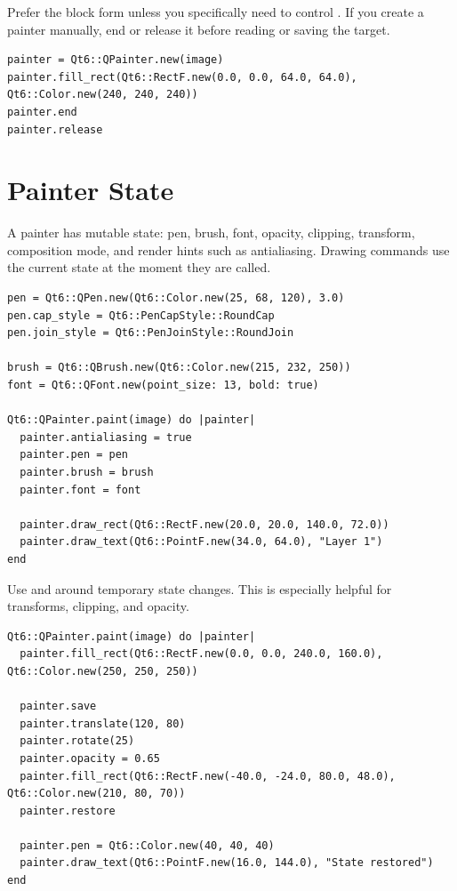Prefer the block form unless you specifically need to control . If you create a painter manually, end or release it before reading or saving the target.

\begin{lstlisting}[style=crystal]
painter = Qt6::QPainter.new(image)
painter.fill_rect(Qt6::RectF.new(0.0, 0.0, 64.0, 64.0), Qt6::Color.new(240, 240, 240))
painter.end
painter.release
\end{lstlisting}

\section{Painter State}

A painter has mutable state: pen, brush, font, opacity, clipping, transform, composition mode, and render hints such as antialiasing. Drawing commands use the current state at the moment they are called.

\begin{lstlisting}[style=crystal]
pen = Qt6::QPen.new(Qt6::Color.new(25, 68, 120), 3.0)
pen.cap_style = Qt6::PenCapStyle::RoundCap
pen.join_style = Qt6::PenJoinStyle::RoundJoin

brush = Qt6::QBrush.new(Qt6::Color.new(215, 232, 250))
font = Qt6::QFont.new(point_size: 13, bold: true)

Qt6::QPainter.paint(image) do |painter|
  painter.antialiasing = true
  painter.pen = pen
  painter.brush = brush
  painter.font = font

  painter.draw_rect(Qt6::RectF.new(20.0, 20.0, 140.0, 72.0))
  painter.draw_text(Qt6::PointF.new(34.0, 64.0), "Layer 1")
end
\end{lstlisting}

Use  and  around temporary state changes. This is especially helpful for transforms, clipping, and opacity.

\begin{lstlisting}[style=crystal]
Qt6::QPainter.paint(image) do |painter|
  painter.fill_rect(Qt6::RectF.new(0.0, 0.0, 240.0, 160.0), Qt6::Color.new(250, 250, 250))

  painter.save
  painter.translate(120, 80)
  painter.rotate(25)
  painter.opacity = 0.65
  painter.fill_rect(Qt6::RectF.new(-40.0, -24.0, 80.0, 48.0), Qt6::Color.new(210, 80, 70))
  painter.restore

  painter.pen = Qt6::Color.new(40, 40, 40)
  painter.draw_text(Qt6::PointF.new(16.0, 144.0), "State restored")
end
\end{lstlisting}

